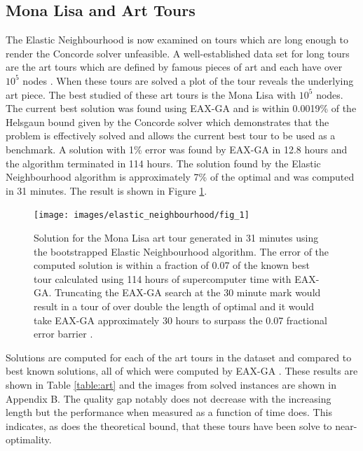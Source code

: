 \subsection{Mona Lisa and Art Tours}
The Elastic Neighbourhood is now examined on tours which are long enough to render the Concorde solver unfeasible. A well-established data set for long tours are the art tours which are defined by famous pieces of art and each have over $10^5$ nodes \cite{ArtTSP}. When these tours are solved a plot of the tour reveals the underlying art piece. The best studied of these art tours is the Mona Lisa with $10^5$ nodes. The current best solution was found using EAX-GA and is within 0.0019\% of the Helsgaun bound given by the Concorde solver which demonstrates that the problem is effectively solved and allows the current best tour to be used as a benchmark. A solution with 1\% error was found by EAX-GA in 12.8 hours and the algorithm terminated in 114 hours. The solution found by the Elastic Neighbourhood algorithm is approximately 7\% of the optimal and was computed in 31 minutes. The result is shown in Figure \ref{fig:monalisa}. 
\begin{figure}
	\centering
	\texttt{[image: images/elastic\_neighbourhood/fig\_1]}
	\def\c{Solution for the Mona Lisa art tour generated in 31 minutes using the bootstrapped Elastic Neighbourhood algorithm. }
	\caption[\c]{\label{fig:monalisa} \c The error of the computed solution is within a fraction of 0.07 of the known best tour calculated using 114 hours of supercomputer time with EAX-GA. Truncating the EAX-GA search at the 30 minute mark would result in a tour of over double the length of optimal and it would take EAX-GA approximately 30 hours to surpass the 0.07 fractional error barrier \cite{Honda2013-ri}.}
\end{figure}
Solutions are computed for each of the art tours in the dataset and compared to best known solutions, all of which were computed by EAX-GA \cite{Nagata2013-we}. These results are shown in Table \ref{table:art} and the images from solved instances are shown in Appendix B. The quality gap notably does not decrease with the increasing length but the performance when measured as a function of time does. This indicates, as does the theoretical bound, that these tours have been solve to near-optimality.
